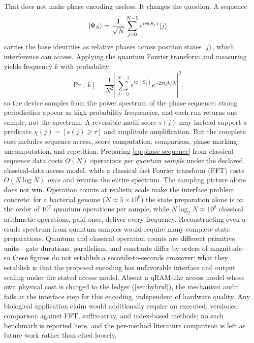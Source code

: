 That does not make phase encoding useless. It changes the question. A sequence
\begin{equation}
\left|\Psi_S\right\rangle=\frac{1}{\sqrt{N}}
\sum_{j=0}^{N-1}e^{i\phi(S_j)}\left|j\right\rangle
\label{eq:phase-sequence}
\end{equation}
carries the base identities as relative phases across position states $\left|j\right\rangle$, which interference can access. Applying the quantum Fourier transform and measuring yields frequency $k$ with probability
\begin{equation}
\Pr[k]=\frac{1}{N^{2}}\left|\sum_{j=0}^{N-1}e^{i\phi(S_j)}e^{-2\pi i jk/N}\right|^{2},
\end{equation}
so the device samples from the power spectrum of the phase sequence: strong periodicities appear as high-probability frequencies, and each run returns one sample, not the spectrum. A reversible motif score $s(j)$ may instead support a predicate $\chi(j)=[s(j)\geq\tau]$ and amplitude amplification. But the complete cost includes sequence access, score computation, comparison, phase marking, uncomputation, and repetition. Preparing \cref{eq:phase-sequence} from classical sequence data costs $O(N)$ operations \emph{per quantum sample} under the declared classical-data access model, while a classical fast Fourier transform (FFT) costs $O(N\log N)$ \emph{once} and returns the entire spectrum. The sampling picture alone does not win. Operation counts at realistic scale make the interface problem concrete: for a bacterial genome ($N\approx5\times10^{6}$) the state preparation alone is on the order of $10^{7}$ quantum operations per sample, while $N\log_2 N\approx10^{8}$ classical arithmetic operations, paid once, deliver every frequency. Reconstructing even a crude spectrum from quantum samples would require many complete state preparations. Quantum and classical operation counts are different primitive units---gate durations, parallelism, and constants differ by orders of magnitude---so these figures do not establish a seconds-to-seconds crossover; what they establish is that the proposed encoding has unfavorable interface and output scaling under the stated access model. Absent a qRAM-like access model whose own physical cost is charged to the ledger (\cref{sec:hybrid}), the mechanism audit fails at the interface step for this encoding, independent of hardware quality. Any biological application claim would additionally require an executed, versioned comparison against FFT, suffix-array, and index-based methods; no such benchmark is reported here, and the per-method literature comparison is left as future work rather than cited loosely.

